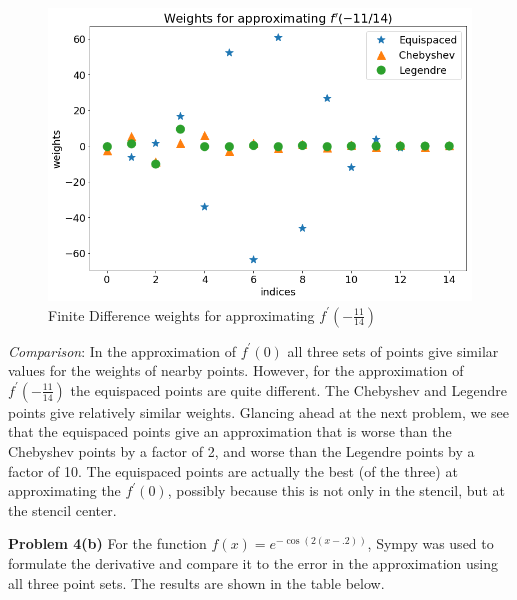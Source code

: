 \documentclass[12pt]{article}
\newcommand{\problem}[1]{\hspace{-4 ex} \large \textbf{Problem #1} }
\begin{document}
\begin{figure}[H]
	\caption{Finite Difference weights for approximating $f^\prime(-\tfrac{11}{14})$}
	\label{weights_at_neg11div14}
	\includegraphics[width=.8\textwidth]{hw1_p4b_weights_-11div14}
	\centering
\end{figure}

\bigbreak


\textit{Comparison}: In the approximation of $f^\prime(0)$ all three sets of points give similar values for the weights of nearby points. However, for the approximation of $f^\prime(-\tfrac{11}{14})$ the equispaced points are quite different. The Chebyshev and Legendre points give relatively similar weights. Glancing ahead at the next problem, we see that the equispaced points give an approximation that is worse than the Chebyshev points by a factor of 2, and worse than the Legendre points by a factor of 10. The equispaced points are actually the best (of the three) at approximating the $f^\prime(0)$, possibly because this is not only in the stencil, but at the stencil center. 
\bigbreak


\problem{4(b)} For the function $f(x)=e^{-\cos(2(x-.2))}$, Sympy was used to formulate the derivative and compare it to the error in the approximation using all three point sets. The results are shown in the table below.
\end{document}
